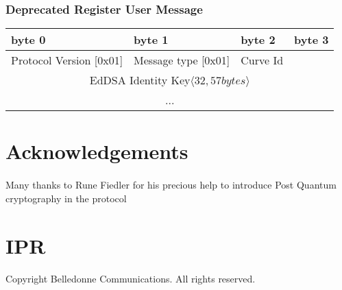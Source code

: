 \documentclass[a4paper,11pt]{article}
\begin{document}
    \subsubsection{Deprecated Register User Message}
      \begin{center}
      \begin{tabular}{ | p{1.4in} | p{1.4in} | p{1.4in} | p{1.4in} |}
        \hline
        \cellcolor[gray]{0.85} byte 0 & \cellcolor[gray]{0.85} byte 1 & \cellcolor[gray]{0.85} byte 2 & \cellcolor[gray]{0.85}byte 3\\
        \hline
        Protocol Version [0x01] & Message type [0x01] & Curve Id &\\
        \cline{1-3}
        \multicolumn{4}{|c|}{EdDSA Identity Key$\langle 32,57bytes\rangle $}\\
        \multicolumn{4}{|c|}{...}\\
        \hline
      \end{tabular}
      \end{center}

\newpage
\section{Acknowledgements}
  \paragraph*{}Many thanks to Rune Fiedler for his precious help to introduce Post Quantum cryptography in the protocol
\newpage
\section{IPR}
  \paragraph*{}Copyright Belledonne Communications.  All rights reserved.
\end{document}
